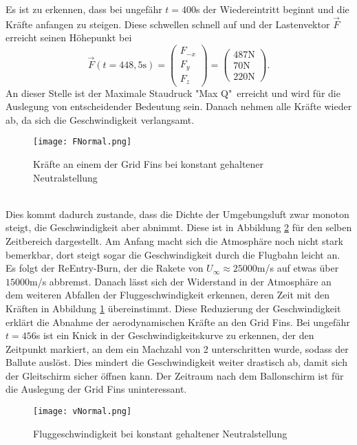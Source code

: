Es ist zu erkennen, dass bei ungefähr $t=400$s der Wiedereintritt beginnt und die Kräfte anfangen zu steigen. Diese schwellen schnell auf und der Lastenvektor $\vec{F}$ erreicht seinen Höhepunkt bei
\begin{equation}
	\vec{F}(t=448,5\mathrm{s})=
		\left(\begin{array}{c}F_{-x}\\F_y\\F_z\end{array}\right)
			=\left(\begin{array}{c}487\mathrm{N}\\70\mathrm{N}\\220\mathrm{N}\end{array}\right).
\end{equation}
An dieser Stelle ist der Maximale Staudruck "Max Q"\ erreicht und wird für die Auslegung von entscheidender Bedeutung sein. Danach nehmen alle Kräfte wieder ab, da sich die Geschwindigkeit verlangsamt. 
\begin{figure}[h]
	\centering
	\texttt{[image: FNormal.png]}
	\caption{Kräfte an einem der Grid Fins bei konstant gehaltener Neutralstellung}
	\label{abb_KraefteNormal}
\end{figure}\\
Dies kommt dadurch zustande, dass die Dichte der Umgebungsluft zwar monoton steigt, die Geschwindigkeit aber abnimmt. Diese ist in Abbildung \ref{abb_vNormal} für den selben Zeitbereich dargestellt. Am Anfang macht sich die Atmosphäre noch nicht stark bemerkbar, dort steigt sogar die Geschwindigkeit durch die Flugbahn leicht an. Es folgt der ReEntry-Burn, der die Rakete von $U_\infty \approx 25000$m/s auf etwas über $15000$m/s abbremst. Danach lässt sich der Widerstand in der Atmosphäre an dem weiteren Abfallen der Fluggeschwindigkeit erkennen, deren Zeit mit den Kräften in Abbildung \ref{abb_KraefteNormal} übereinstimmt. Diese Reduzierung der Geschwindigkeit erklärt die Abnahme der aerodynamischen Kräfte an den Grid Fins. Bei ungefähr $t=456$s ist ein Knick in der Geschwindigkeitskurve zu erkennen, der den Zeitpunkt markiert, an dem ein Machzahl von 2 unterschritten wurde, sodass der Ballute auslöst. Dies mindert die Geschwindigkeit weiter drastisch ab, damit sich der Gleitschirm sicher öffnen kann. Der Zeitraum nach dem Ballonschirm ist für die Auslegung der Grid Fins uninteressant.
\begin{figure}[h]
	\centering
	\texttt{[image: vNormal.png]}
	\caption{Fluggeschwindigkeit bei konstant gehaltener Neutralstellung}
	\label{abb_vNormal}
\end{figure}\\~\\
